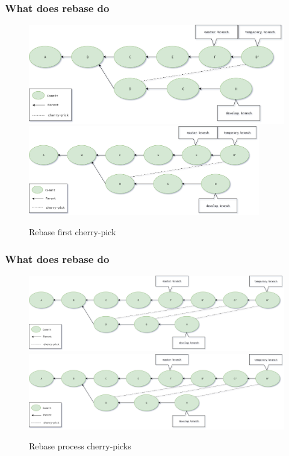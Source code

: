 \begin{frame}[fragile]
    \frametitle{What does rebase do}
    \begin{figure}
        \begin{center}
            {
                \includegraphics[width=1\textwidth,keepaspectratio]{./images/Rebase_FirstCherryPick.png}
            }
            {
                \includegraphics[width=0.9\textwidth,keepaspectratio]{./images/Rebase_FirstCherryPick.png}
            }
            \caption{Rebase first cherry-pick}
        \end{center}
    \end{figure}
\end{frame}

\begin{frame}[fragile]
    \frametitle{What does rebase do}
    \begin{figure}
        \begin{center}
            {
                \includegraphics[width=1\textwidth,keepaspectratio]{./images/Rebase-Process.png}
            }
            {
                \includegraphics[width=1\textwidth,keepaspectratio]{./images/Rebase-Process.png}
            }
            \caption{Rebase process cherry-picks}
        \end{center}
    \end{figure}
\end{frame}

